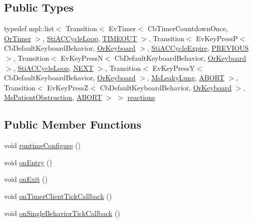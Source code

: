 \subsection*{Public Types}
\begin{DoxyCompactItemize}
\item 
typedef mpl\+::list$<$ Transition$<$ Ev\+Timer$<$ Cb\+Timer\+Countdown\+Once, \hyperlink{classsm__respira__1_1_1OrTimer}{Or\+Timer} $>$, \hyperlink{structsm__respira__1_1_1ac__cycle__inner__states_1_1StiACCycleLoop}{Sti\+A\+C\+Cycle\+Loop}, \hyperlink{structsm__respira__1_1_1ac__cycle__inner__states_1_1StiACCycleDwell_1_1TIMEOUT}{T\+I\+M\+E\+O\+UT} $>$, Transition$<$ Ev\+Key\+PressP$<$ Cb\+Default\+Keyboard\+Behavior, \hyperlink{classsm__respira__1_1_1OrKeyboard}{Or\+Keyboard} $>$, \hyperlink{structsm__respira__1_1_1ac__cycle__inner__states_1_1StiACCycleExpire}{Sti\+A\+C\+Cycle\+Expire}, \hyperlink{structsm__respira__1_1_1ac__cycle__inner__states_1_1StiACCycleDwell_1_1PREVIOUS}{P\+R\+E\+V\+I\+O\+US} $>$, Transition$<$ Ev\+Key\+PressN$<$ Cb\+Default\+Keyboard\+Behavior, \hyperlink{classsm__respira__1_1_1OrKeyboard}{Or\+Keyboard} $>$, \hyperlink{structsm__respira__1_1_1ac__cycle__inner__states_1_1StiACCycleLoop}{Sti\+A\+C\+Cycle\+Loop}, \hyperlink{structsm__respira__1_1_1ac__cycle__inner__states_1_1StiACCycleDwell_1_1NEXT}{N\+E\+XT} $>$, Transition$<$ Ev\+Key\+PressY$<$ Cb\+Default\+Keyboard\+Behavior, \hyperlink{classsm__respira__1_1_1OrKeyboard}{Or\+Keyboard} $>$, \hyperlink{classsm__respira__1_1_1MsLeakyLung}{Ms\+Leaky\+Lung}, \hyperlink{classABORT}{A\+B\+O\+RT} $>$, Transition$<$ Ev\+Key\+PressZ$<$ Cb\+Default\+Keyboard\+Behavior, \hyperlink{classsm__respira__1_1_1OrKeyboard}{Or\+Keyboard} $>$, \hyperlink{classsm__respira__1_1_1MsPatientObstruction}{Ms\+Patient\+Obstruction}, \hyperlink{classABORT}{A\+B\+O\+RT} $>$ $>$ \hyperlink{structsm__respira__1_1_1ac__cycle__inner__states_1_1StiACCycleDwell_ac7b785d83753f2a557af1ea316548944}{reactions}
\end{DoxyCompactItemize}
\subsection*{Public Member Functions}
\begin{DoxyCompactItemize}
\item 
void \hyperlink{structsm__respira__1_1_1ac__cycle__inner__states_1_1StiACCycleDwell_a64ecc796ff46fff1b6f285c0b6846cd6}{runtime\+Configure} ()
\item 
void \hyperlink{structsm__respira__1_1_1ac__cycle__inner__states_1_1StiACCycleDwell_a3c863cd608c0ab01cc611743c5b18764}{on\+Entry} ()
\item 
void \hyperlink{structsm__respira__1_1_1ac__cycle__inner__states_1_1StiACCycleDwell_aa266883f3da5f8123aa1e18c29b8b4ef}{on\+Exit} ()
\item 
void \hyperlink{structsm__respira__1_1_1ac__cycle__inner__states_1_1StiACCycleDwell_a8543bc0af22558db94fffb3f89d52816}{on\+Timer\+Client\+Tick\+Callback} ()
\item 
void \hyperlink{structsm__respira__1_1_1ac__cycle__inner__states_1_1StiACCycleDwell_ae47401c4b2d0388058438bc85cccfbba}{on\+Single\+Behavior\+Tick\+Callback} ()
\end{DoxyCompactItemize}
